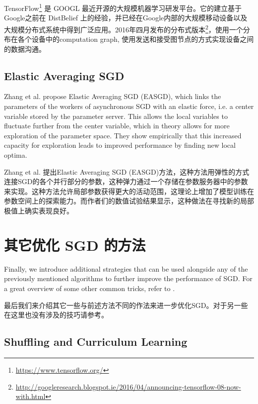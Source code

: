 \documentclass{article}
\begin{document}
TensorFlow\footnote{\url{https://www.tensorflow.org/}} \cite{Abadi2015a} 是 GOOGL 最近开源的大规模机器学习研发平台。它的建立基于Google之前在 DistBelief 上的经验，并已经在Google内部的大规模移动设备以及大规模分布式系统中得到广泛应用。2016年四月发布的分布式版本\footnote{\url{http://googleresearch.blogspot.ie/2016/04/announcing-tensorflow-08-now-with.html}}，使用一个分布在各个设备中的computation graph, 使用发送和接受图节点的方式实现设备之间的数据沟通。

\subsection{Elastic Averaging SGD}

Zhang et al. \cite{Zhang2014} propose Elastic Averaging SGD (EASGD), which links the parameters of the workers of asynchronous SGD with an elastic force, i.e. a center variable stored by the parameter server. This allows the local variables to fluctuate further from the center variable, which in theory allows for more exploration of the parameter space. They show empirically that this increased capacity for exploration leads to improved performance by finding new local optima.

Zhang et al. \cite{Zhang2014} 提出Elastic Averaging SGD (EASGD)方法，这种方法用弹性的方式连接SGD的各个并行部分的参数，这种弹力通过一个存储在参数服务器中的参数来实现。这种方法允许局部参数获得更大的活动范围，这理论上增加了模型训练在参数空间上的探索能力。而作者们的数值试验结果显示，这种做法在寻找新的局部极值上确实表现良好。

\section{其它优化 SGD 的方法} \label{sec:strategies}

Finally, we introduce additional strategies that can be used alongside any of the previously mentioned algorithms to further improve the performance of SGD. For a great overview of some other common tricks, refer to \cite{LeCun1998}.

最后我们来介绍其它一些与前述方法不同的作法来进一步优化SGD。对于另一些在这里也没有涉及的技巧请参考\cite{LeCun1998}。

\subsection{Shuffling and Curriculum Learning} \label{sec:shuffling}
\end{document}
